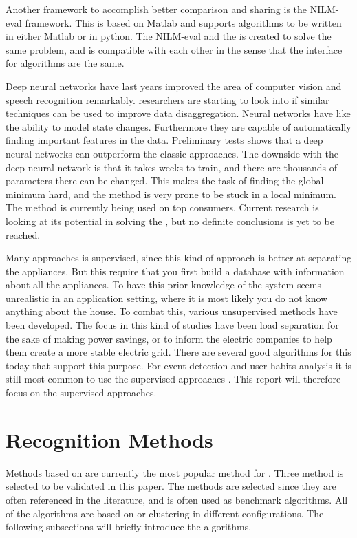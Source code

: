 Another framework to accomplish better comparison and sharing is the NILM-eval framework. This is based on Matlab and supports algorithms to be written in either Matlab or in python. The NILM-eval and the  is created to solve the same problem, and is compatible with each other in the sense that the interface for algorithms are the same\citep{RefWorks:26}. 

Deep neural networks have last years improved the area of computer vision and speech recognition remarkably.  researchers are starting to look into if similar techniques can be used to improve data disaggregation. Neural networks have like  the ability to model state changes. Furthermore they are capable of automatically finding important features in the data. Preliminary tests shows that a deep neural networks can outperform the classic  approaches. The downside with the deep neural network is that it takes weeks to train, and there are thousands of parameters there can be changed. This makes the task of finding the global minimum hard, and the method is very prone to be stuck in a local minimum. The method is currently being used on top consumers\citep{RefWorks:25}. Current research is looking at its potential in solving the , but no definite conclusions is yet to be reached. 

Many approaches is supervised, since this kind of approach is better at separating the appliances. But this require that you first build a database with information about all the appliances. To have this prior knowledge of the system seems unrealistic in an application setting, where it is most likely you do not know anything about the house. To combat this, various unsupervised methods have been developed. The focus in this kind of studies have been load separation for the sake of making power savings, or to inform the electric companies to help them create a more stable electric grid. There are several good algorithms for this today that support this purpose. For event detection and user habits analysis it is still most common to use the supervised approaches \citep{RefWorks:19}. This report will therefore focus on the supervised approaches. 

\newpage
			

\section{Recognition Methods}
\label{RecognitionMethods}
Methods based on  are currently the most popular method for . Three method is selected to be validated in this paper. The methods are selected since they are often referenced in the literature, and is often used as benchmark algorithms. All of the algorithms are based on  or clustering in different configurations. The following subsections will briefly introduce the algorithms. 

